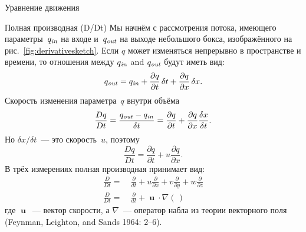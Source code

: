 \begin{chapter}{Уравнение движения}
\begin{section}{Полная производная (D/Dt)}
Мы начнём с рассмотрения потока, имеющего параметры~$q_{\text{\textit{in}}}$ на входе и~$q_{\text{\textit{out}}}$
на выходе небольшого бокса, изображённого на рис.~\ref{fig:derivativesketch}.
Если $q$ может изменяться непрерывно в пространстве и времени, то
отношения между $q_{\text{\textit{in}}}$ and $q_{\text{\textit{out}}}$ будут иметь вид:
\begin{equation}
q_{\text{\textit{out}}} = q_{\text{\textit{in}}} + \frac{\partial{q}}{\partial{t}}\,\delta{t} 
             + \frac{\partial{q}}{\partial{x}}\,\delta{x}.
\end{equation}
Скорость изменения параметра~$q$ внутри объёма
\begin{equation}
\frac{Dq}{Dt} = \frac{q_{\text{\textit{out}}} - q_{\text{\textit{in}}}}{\delta{t}}
              = \frac{\partial{q}}{\partial{t}} 
                + \frac{\partial{q}}{\partial{x}}\frac{\delta{x}}{\delta{t}}.
\end{equation}
Но $\delta x /\delta t$~--- это скорость~$u$, поэтому
\begin{displaymath}
\frac{Dq}{Dt} = \frac{\partial{q}}{\partial{t}} 
                + u\frac{\partial{q}}{\partial{x}}.
\end{displaymath}
В трёх измерениях полная производная принимает вид:
\begin{subequations}\label{eq:7.7}
\begin{align}
\frac{D}{Dt} = & \:\frac{\partial}{dt} + u\frac{\partial}{\partial{x}} 
                                       + v\frac{\partial}{\partial y} 
                                       + w\frac{\partial}{\partial z} \\
\frac{D}{Dt} = & \:\frac{\partial}{dt} + \mbfu \cdot \nabla(\,)
\end{align}
\end{subequations}
где $\mbfu$~--- вектор скорости, а $\nabla$~--- оператор набла из теории
векторного поля (Feynman, Leighton, and Sands 1964: 2--6).
%

\end{section}
\end{chapter}
